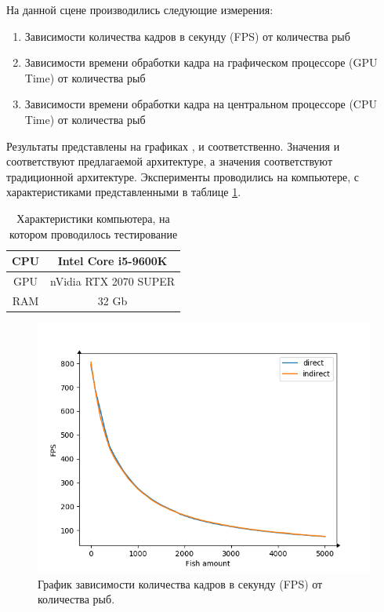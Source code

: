 	\FloatBarrier
	На данной сцене производились следующие измерения:
	\begin{enumerate}[1.]
		\item Зависимости количества кадров в секунду (FPS) от количества рыб
		\item Зависимости времени обработки кадра на графическом процессоре (GPU Time) от количества рыб
		\item Зависимости времени обработки кадра на центральном процессоре (CPU Time) от количества рыб
	\end{enumerate}

	Результаты представлены на графиках ,  и  соответственно. Значения  и соответствуют предлагаемой архитектуре, а значения  соответствуют традиционной архитектуре. Эксперименты проводились на компьютере, с характеристиками представленными в таблице \ref{tab:spec}.
	
	\begin{table}[ht]
		\caption{Характеристики компьютера, на котором проводилось тестирование}
		\label{tab:spec}
		\centering
		\begin{SingleSpace}
			\begin{tabular}{|c|c|}
				\hline
				CPU & Intel Core 
				i5-9600K
				\\
				\hline
				GPU & nVidia RTX 2070 SUPER \\
				\hline
				RAM & 32 Gb \\
				\hline
		\end{tabular}
		\end{SingleSpace}
	\end{table}
	
	\begin{figure}[ht!] 
		\center
		\includegraphics [scale=0.8] {my_folder/images//fps_plot}	
		\caption{График зависимости количества кадров в секунду (FPS) от количества рыб. } 
		\label{fig:fps_plot}
	\end{figure}

